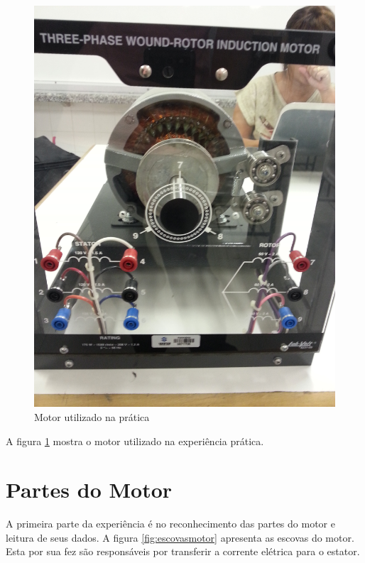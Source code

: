\documentclass[paper=a4, fontsize=11pt]{article}
\begin{document}
\begin{figure}[!ht]
    \centering
    \includegraphics[scale=0.1, angle=-90]{20140326_173203.jpg}
    \caption{Motor utilizado na prática}
    \label{fig:motorutilizado}
\end{figure}

A figura \ref{fig:motorutilizado} mostra o motor utilizado
na experiência prática.

\section{Partes do Motor}

A primeira parte da experiência é no reconhecimento das partes
do motor e leitura de seus dados. A figura \ref{fig:escovasmotor}
apresenta as escovas do motor. Esta por sua fez são responsáveis
por transferir a corrente elétrica para o estator.
\end{document}
